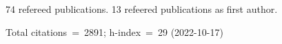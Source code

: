 74 refereed publications. 13 refeered publications as first author.

Total citations~=~2891; h-index~=~29 (2022-10-17)